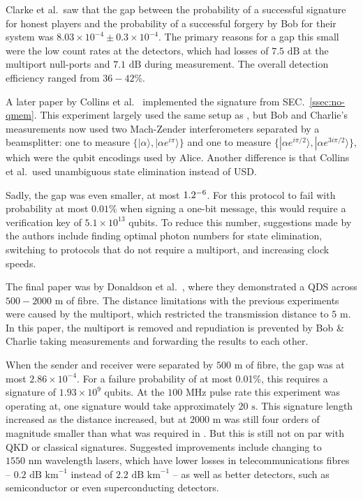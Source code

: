 \documentclass[%
 reprint,
 amsmath,amssymb,
 aps,
 pra,
]{revtex4-1}
\begin{document}
Clarke et al.\ saw that the gap between the probability of a successful signature for honest players and the probability of a successful forgery by Bob for their system was $8.03 \times 10^{-4} \pm 0.3 \times 10^{-4}$. The primary reasons for a gap this small were the low count rates at the detectors, which had losses of $7.5 \text{ dB}$ at the multiport null-ports and $7.1 \text{ dB}$ during measurement. The overall detection efficiency ranged from $36-42\%$.

A later paper by Collins et al.\ \cite{PhysRevLett.113.040502} implemented the signature from SEC.\ \ref{ssec:no-qmem}. This experiment largely used the same setup as \cite{CCD+12}, but Bob and Charlie's measurements now used two Mach-Zender interferometers separated by a beamsplitter: one to measure $\{|\alpha\rangle, |\alpha e^{i\pi}\rangle\}$ and one to measure $\{|\alpha e^{i\pi/2}\rangle, |\alpha e^{3i\pi/2}\rangle\}$, which were the qubit encodings used by Alice. Another difference is that Collins et al.\ used unambiguous state elimination instead of USD.

Sadly, the gap was even smaller, at most $1.2 \time 10^{-6}$. For this protocol to fail with probability at most $0.01\%$ when signing a one-bit message, this would require a verification key of $5.1 \times 10^{13}$ qubits. To reduce this number, suggestions made by the authors include finding optimal photon numbers for state elimination, switching to protocols that do not require a multiport, and increasing clock speeds.

The final paper was by Donaldson et al.\ \cite{PhysRevA.93.012329}, where they demonstrated a QDS across $500-2000\text{ m}$ of fibre. The distance limitations with the previous experiments were caused by the multiport, which restricted the transmission distance to $5\text{ m}$. In this paper, the multiport is removed and repudiation is prevented by Bob \& Charlie taking measurements and forwarding the results to each other.

When the sender and receiver were separated by $500 \text{ m}$ of fibre, the gap was at most $2.86 \times 10^{-4}$. For a failure probability of at most 0.01\%, this requires a signature of $1.93 \times 10^{9}$ qubits. At the $100 \text{ MHz}$ pulse rate this experiment was operating at, one signature would take approximately $20 \text{ s}$. This signature length increased as the distance increased, but at $2000\text{ m}$ was still four orders of magnitude smaller than what was required in \cite{PhysRevLett.113.040502}. But this is still not on par with QKD or classical signatures. Suggested improvements include changing to $1550 \text{ nm}$ wavelength lasers, which have lower losses in telecommunications fibres -- $0.2\text{ dB km}^{-1}$ instead of $2.2\text{ dB km}^{-1}$ -- as well as better detectors, such as semiconductor \cite{0957-0233-21-1-012002} or even superconducting \cite{0953-2048-25-6-063001} detectors.
\end{document}
